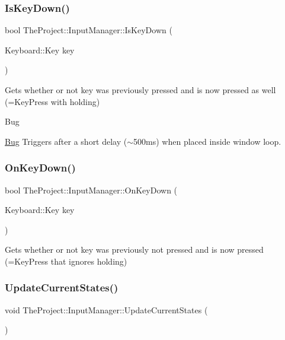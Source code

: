 \subsubsection{\texorpdfstring{Is\+Key\+Down()}{IsKeyDown()}}
{\footnotesize\ttfamily bool The\+Project\+::\+Input\+Manager\+::\+Is\+Key\+Down (\begin{DoxyParamCaption}\item[{Keyboard\+::\+Key}]{key }\end{DoxyParamCaption})}



Gets whether or not key was previously pressed and is now pressed as well (=Key\+Press with holding) 

\begin{DoxyRefDesc}{Bug}
\item[\mbox{\hyperlink{bug__bug000001}{Bug}}]Triggers after a short delay ($\sim$500ms) when placed inside window loop. \end{DoxyRefDesc}
\mbox{\label{class_the_project_1_1_input_manager_aba7f889c5258aa96a7314371755a03ac}} 
\subsubsection{\texorpdfstring{On\+Key\+Down()}{OnKeyDown()}}
{\footnotesize\ttfamily bool The\+Project\+::\+Input\+Manager\+::\+On\+Key\+Down (\begin{DoxyParamCaption}\item[{Keyboard\+::\+Key}]{key }\end{DoxyParamCaption})}



Gets whether or not key was previously not pressed and is now pressed (=Key\+Press that ignores holding) 

\mbox{\label{class_the_project_1_1_input_manager_a766d64cfa0d1ad4e78b42c03a32d02eb}} 
\subsubsection{\texorpdfstring{Update\+Current\+States()}{UpdateCurrentStates()}}
{\footnotesize\ttfamily void The\+Project\+::\+Input\+Manager\+::\+Update\+Current\+States (\begin{DoxyParamCaption}{ }\end{DoxyParamCaption})}



